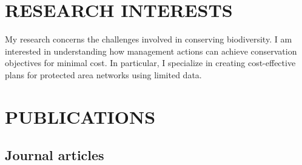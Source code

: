 \documentclass[12pt,a4paper]{article}
\begin{document}
\section*{RESEARCH INTERESTS}

My research concerns the challenges involved in conserving biodiversity. I am interested in understanding how management actions can achieve conservation objectives for minimal cost. In particular, I specialize in creating cost-effective plans for protected area networks using limited data.

\section*{PUBLICATIONS}
\subsection*{Journal articles}
\end{document}
